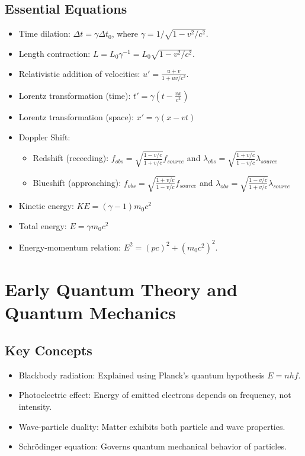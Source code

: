 \documentclass{article}
\newcommand{\eqbox}[1]{\begin{tcolorbox}[colback=gray!10] #1 \end{tcolorbox}}
\newcommand{\conceptbox}[1]{\begin{tcolorbox}[colback=blue!10] #1 \end{tcolorbox}}
\begin{document}
\subsection{Essential Equations}
\eqbox{
    \begin{itemize}
        \item Time dilation: $\Delta t = \gamma \Delta t_0$, where $\gamma = 1/\sqrt{1 - v^2/c^2}$.
        \item Length contraction: $L = L_0 \gamma^{-1} = L_0 \sqrt{1 - v^2/c^2}$.
        \item Relativistic addition of velocities: $u' = \frac{u + v}{1 + uv/c^2}$.
        \item Lorentz transformation (time):  $t' = \gamma(t - \frac{vx}{c^2})$
        \item Lorentz transformation (space):  $x' = \gamma(x - vt)$
        \item Doppler Shift:
        \begin{itemize}
            \item Redshift (receeding): $f_{obs} = \sqrt{\displaystyle\frac{1 - v/c}{1 + v/c}}f_{source}$ and $ \lambda_{obs} = \sqrt{\displaystyle\frac{1 + v/c}{1 - v/c}}\lambda_{source} $
            \item Blueshift (approaching): $f_{obs} = \sqrt{\displaystyle\frac{1 + v/c}{1 - v/c}}f_{source}$ and $ \lambda_{obs} = \sqrt{\displaystyle\frac{1 - v/c}{1 + v/c}}\lambda_{source} $
        \end{itemize} 
        \item Kinetic energy: $KE = (\gamma - 1)m_0c^2$
        \item Total energy:  $E = \gamma m_0c^2$
        \item Energy-momentum relation: $E^2 = (pc)^2 + (m_0c^2)^2$.
    \end{itemize}
}

\section{Early Quantum Theory and Quantum Mechanics}

\subsection{Key Concepts}
\conceptbox{
\begin{itemize}
    \item Blackbody radiation: Explained using Planck's quantum hypothesis $E = nhf$.
    \item Photoelectric effect: Energy of emitted electrons depends on frequency, not intensity.
    \item Wave-particle duality: Matter exhibits both particle and wave properties.
    \item Schr\"odinger equation: Governs quantum mechanical behavior of particles.
\end{itemize}
}
\end{document}
